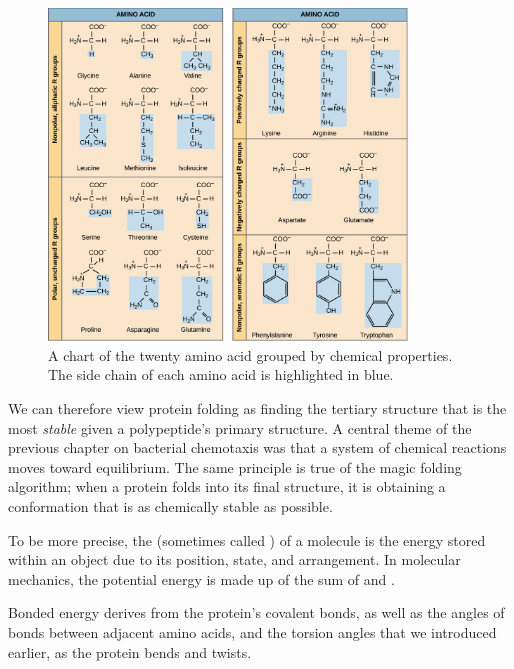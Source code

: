 \begin{figure}[h]
	\centering
	\mySfFamily
	\includegraphics[width = 0.85\textwidth]{../images/AminoAcidChart.png}
	\caption{A chart of the twenty amino acid grouped by chemical properties. The side chain of each amino acid is highlighted in blue.}
	\label{fig:AminoAcidChart}
\end{figure}

We can therefore view protein folding as finding the tertiary structure that is the most \textit{stable} given a polypeptide's primary structure. A central theme of the previous chapter on bacterial chemotaxis was that a system of chemical reactions moves toward equilibrium. The same principle is true of the magic folding algorithm; when a protein folds into its final structure, it is obtaining a conformation that is as chemically stable as possible.

To be more precise, the  (sometimes called ) of a molecule is the energy stored within an object due to its position, state, and arrangement. In molecular mechanics, the potential energy is made up of the sum of  and .

Bonded energy derives from the protein's covalent bonds, as well as the angles of bonds between adjacent amino acids, and the torsion angles that we introduced earlier, as the protein bends and twists.

